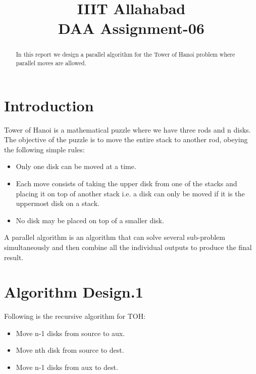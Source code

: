 \documentclass[conference]{IEEEtran}
\begin{document}
\title{IIIT Allahabad\\DAA Assignment-06\\
}

\author{
\and
{}
\and
{}
}

\maketitle

\begin{abstract}
In this report we design a parallel algorithm for the Tower of Hanoi problem where parallel moves are allowed.

\end{abstract}

\section{Introduction}
Tower of Hanoi is a mathematical puzzle where we have three rods and n disks. The objective of the puzzle is to move the entire stack to another rod, obeying the following simple rules: 

\begin{itemize}
\item Only one disk can be moved at a time.
\item Each move consists of taking the upper disk from one of the stacks and placing it on top of another stack i.e. a disk can only be moved if it is the uppermost disk on a stack.
\item No disk may be placed on top of a smaller disk.\\
\end{itemize}

A parallel algorithm is an algorithm that can solve several sub-problem simultaneously and then combine all the individual outputs to produce the final result.

\section{Algorithm Design.1}
Following is the recursive algorithm for TOH:
\begin{itemize}
    \item Move n-1 disks from source to aux.
    \item Move nth disk from source to dest.
    \item Move n-1 disks from aux to dest.
\end{itemize}
\end{document}
